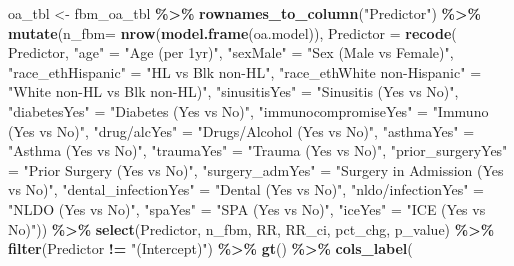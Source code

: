 \documentclass[
]{article}
\newenvironment{Shaded}{\begin{snugshade}}{\end{snugshade}}
\newcommand{\AttributeTok}[1]{\textcolor[rgb]{0.13,0.29,0.53}{#1}}
\newcommand{\FunctionTok}[1]{\textcolor[rgb]{0.13,0.29,0.53}{\textbf{#1}}}
\newcommand{\NormalTok}[1]{#1}
\newcommand{\OtherTok}[1]{\textcolor[rgb]{0.56,0.35,0.01}{#1}}
\newcommand{\SpecialCharTok}[1]{\textcolor[rgb]{0.81,0.36,0.00}{\textbf{#1}}}
\newcommand{\StringTok}[1]{\textcolor[rgb]{0.31,0.60,0.02}{#1}}
\begin{document}
\begin{Shaded}
\begin{Highlighting}[]
\NormalTok{oa\_tbl }\OtherTok{\textless{}{-}}\NormalTok{ fbm\_oa\_tbl }\SpecialCharTok{\%\textgreater{}\%}
  \FunctionTok{rownames\_to\_column}\NormalTok{(}\StringTok{"Predictor"}\NormalTok{) }\SpecialCharTok{\%\textgreater{}\%} 
  \FunctionTok{mutate}\NormalTok{(}\AttributeTok{n\_fbm=} \FunctionTok{nrow}\NormalTok{(}\FunctionTok{model.frame}\NormalTok{(oa.model)),}
      \AttributeTok{Predictor =} \FunctionTok{recode}\NormalTok{(}
\NormalTok{        Predictor,}
        \StringTok{"age"} \OtherTok{=} \StringTok{"Age (per 1yr)"}\NormalTok{,}
        \StringTok{"sexMale"} \OtherTok{=} \StringTok{"Sex (Male vs Female)"}\NormalTok{,}
        \StringTok{"race\_ethHispanic"} \OtherTok{=} \StringTok{"HL vs Blk non{-}HL"}\NormalTok{,}
        \StringTok{"race\_ethWhite non{-}Hispanic"} \OtherTok{=} \StringTok{"White non{-}HL vs Blk non{-}HL)"}\NormalTok{,}
        \StringTok{"sinusitisYes"} \OtherTok{=} \StringTok{"Sinusitis (Yes vs No)"}\NormalTok{,}
        \StringTok{"diabetesYes"} \OtherTok{=} \StringTok{"Diabetes (Yes vs No)"}\NormalTok{,}
        \StringTok{"immunocompromiseYes"} \OtherTok{=} \StringTok{"Immuno (Yes vs No)"}\NormalTok{,}
        \StringTok{"\textasciigrave{}drug/alc\textasciigrave{}Yes"} \OtherTok{=} \StringTok{"Drugs/Alcohol (Yes vs No)"}\NormalTok{,}
        \StringTok{"asthmaYes"} \OtherTok{=} \StringTok{"Asthma (Yes vs No)"}\NormalTok{,}
        \StringTok{"traumaYes"} \OtherTok{=} \StringTok{"Trauma (Yes vs No)"}\NormalTok{,}
        \StringTok{"prior\_surgeryYes"} \OtherTok{=} \StringTok{"Prior Surgery (Yes vs No)"}\NormalTok{,}
        \StringTok{"surgery\_admYes"} \OtherTok{=} \StringTok{"Surgery in Admission (Yes vs No)"}\NormalTok{,}
        \StringTok{"dental\_infectionYes"} \OtherTok{=} \StringTok{"Dental (Yes vs No)"}\NormalTok{,}
        \StringTok{"\textasciigrave{}nldo/infection\textasciigrave{}Yes"} \OtherTok{=} \StringTok{"NLDO (Yes vs No)"}\NormalTok{,}
        \StringTok{"spaYes"} \OtherTok{=} \StringTok{"SPA (Yes vs No)"}\NormalTok{,}
        \StringTok{"iceYes"} \OtherTok{=} \StringTok{"ICE (Yes vs No)"}\NormalTok{)) }\SpecialCharTok{\%\textgreater{}\%} 
  \FunctionTok{select}\NormalTok{(Predictor, n\_fbm, RR, RR\_ci, pct\_chg, p\_value) }\SpecialCharTok{\%\textgreater{}\%}
  \FunctionTok{filter}\NormalTok{(Predictor }\SpecialCharTok{!=} \StringTok{"(Intercept)"}\NormalTok{) }\SpecialCharTok{\%\textgreater{}\%} 
  \FunctionTok{gt}\NormalTok{() }\SpecialCharTok{\%\textgreater{}\%}
  \FunctionTok{cols\_label}\NormalTok{(}

\end{Highlighting}
\end{Shaded}
\end{document}
